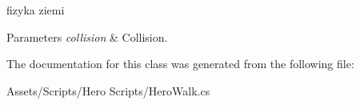 fizyka ziemi 


\begin{DoxyParams}{Parameters}
{\em collision} & Collision.\\
\hline
\end{DoxyParams}


The documentation for this class was generated from the following file\+:\begin{DoxyCompactItemize}
\item 
Assets/\+Scripts/\+Hero Scripts/Hero\+Walk.\+cs\end{DoxyCompactItemize}
